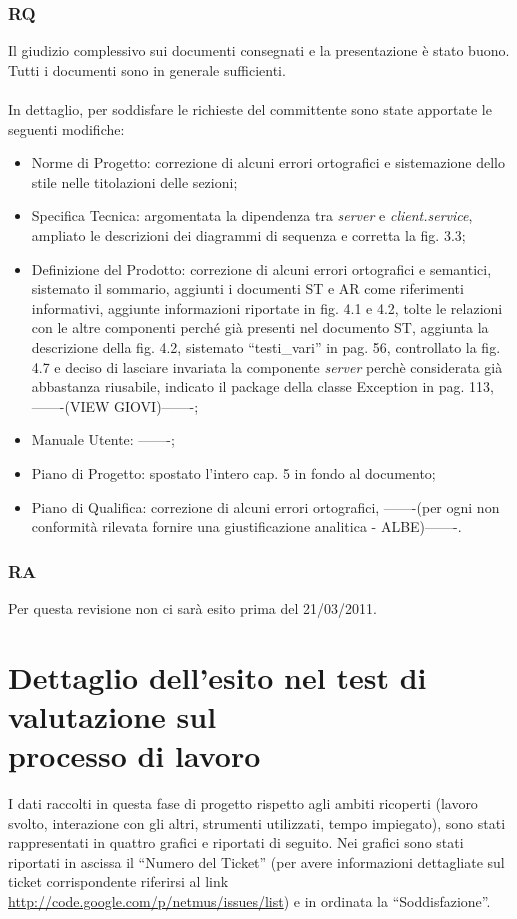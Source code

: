 \subsubsection*{RQ}
Il giudizio complessivo sui documenti consegnati e la presentazione \`e stato
buono. Tutti i documenti sono in generale sufficienti.  \\ \\ In dettaglio, per
soddisfare le richieste del committente sono state apportate le seguenti modifiche:
\begin{itemize}
  \item Norme di Progetto: correzione di alcuni errori ortografici e
  sistemazione dello stile nelle titolazioni delle sezioni;
  \item Specifica Tecnica: argomentata la dipendenza tra \emph{server} e
  \emph{client.service}, ampliato le descrizioni dei diagrammi di sequenza e
  corretta la fig. 3.3;
  \item Definizione del Prodotto: correzione di alcuni errori
  ortografici e semantici, sistemato il sommario, aggiunti i documenti ST e AR
  come riferimenti informativi, aggiunte informazioni riportate in fig. 4.1 e
  4.2, tolte le relazioni con le altre componenti perch\'e gi\`a presenti nel
  documento ST, aggiunta la descrizione della fig. 4.2, sistemato
  ``testi\_vari'' in pag. 56, controllato la fig. 4.7 e deciso di
  lasciare invariata la componente \emph{server} perch\`e considerata gi\`a
  abbastanza riusabile, indicato il package della classe Exception
  in pag. 113, -------(VIEW GIOVI)-------;
  \item Manuale Utente: -------;
  \item Piano di Progetto: spostato l'intero cap. 5 in fondo al documento;
  \item Piano di Qualifica: correzione di alcuni errori ortografici, -------(per
  ogni non conformit\`a rilevata fornire una giustificazione analitica
  - ALBE)-------.
\end{itemize}

\subsubsection*{RA}
Per questa revisione non ci sar\`a esito prima del 21/03/2011.

\section{Dettaglio dell'esito nel test di valutazione sul\\ processo di lavoro}
I dati raccolti in questa fase di progetto rispetto agli ambiti ricoperti
(lavoro svolto, interazione con gli altri, strumenti utilizzati, tempo
impiegato), sono stati rappresentati in quattro grafici e riportati di seguito.
Nei grafici sono stati riportati in ascissa il ``Numero del Ticket'' (per avere
informazioni dettagliate sul ticket corrispondente riferirsi al link
\url{http://code.google.com/p/netmus/issues/list}) e in ordinata la
``Soddisfazione''.

